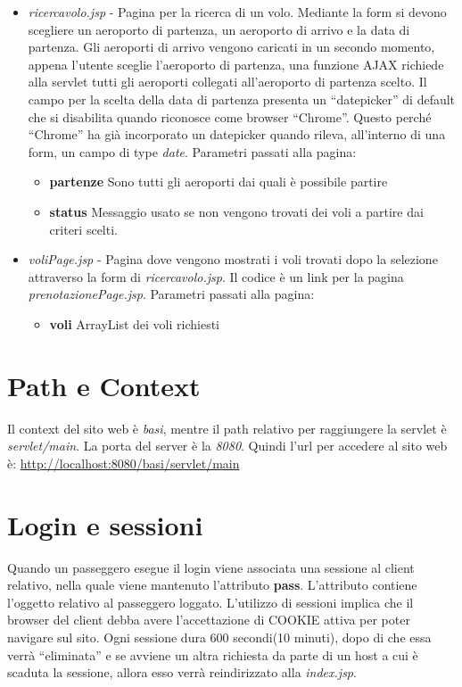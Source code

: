 \documentclass[a4paper,10pt]{article}
\begin{document}
\begin{itemize}
 \item \textit{ricercavolo.jsp} - Pagina per la ricerca di un volo. Mediante la form si devono scegliere un aeroporto di partenza, un aeroporto di arrivo e la data 
				 di partenza. 
				 Gli aeroporti di arrivo vengono caricati in un secondo momento, appena l'utente sceglie l'aeroporto di partenza, una funzione AJAX richiede alla servlet tutti gli
				 aeroporti collegati all'aeroporto di partenza scelto.
				 Il campo per la scelta della data di partenza presenta un ``datepicker'' di default che si disabilita quando riconosce come browser ``Chrome''. Questo perch\'e 
				 ``Chrome'' ha gi\`a incorporato un datepicker quando rileva, all'interno di una form, un campo di type \textit{date}.
 			Parametri passati alla pagina:
			\begin{itemize}
			 \item \textbf{partenze} Sono tutti gli aeroporti dai quali \`e possibile partire
			 \item \textbf{status} Messaggio usato se non vengono trovati dei voli a partire dai criteri scelti.
			\end{itemize}
			
 \item \textit{voliPage.jsp} - Pagina dove vengono mostrati i voli trovati dopo la selezione attraverso la form di \textit{ricercavolo.jsp}. Il codice \`e un link per la pagina \textit{prenotazionePage.jsp}.
 			Parametri passati alla pagina:
			\begin{itemize}
			\item \textbf{voli} ArrayList dei voli richiesti 
			\end{itemize}
\end{itemize}

\section{Path e Context}
Il context del sito web \`e \textit{basi}, mentre il path relativo per raggiungere la servlet \`e \textit{servlet/main}. La porta del server \`e la \textit{8080}.
Quindi l'url per accedere al sito web \`e: \url{http://localhost:8080/basi/servlet/main}

\section{Login e sessioni}
Quando un passeggero esegue il login viene associata una sessione al client relativo, nella quale viene mantenuto
l'attributo \textbf{pass}. L'attributo contiene l'oggetto relativo al passeggero loggato.
L'utilizzo di sessioni implica che il browser del client debba avere l'accettazione 
di COOKIE attiva per poter navigare sul sito.
Ogni sessione dura 600 secondi(10 minuti), dopo di che  essa verr\`a ``eliminata'' e se 
avviene   un   altra   richiesta   da   parte   di   un   host   a   cui   \`e   scaduta   la   sessione,   allora   esso   verr\`a 
reindirizzato alla \textit{index.jsp}.
\end{document}
